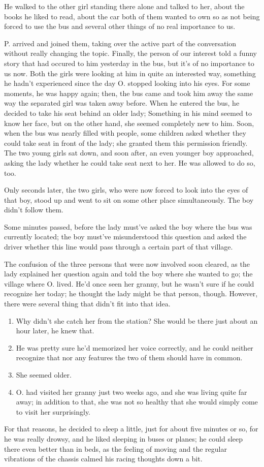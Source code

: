 He walked to the other girl standing there alone and talked to her, about the books he liked to read, about the car both of them wanted to own so as not being forced to use the bus and several other things of no real importance to us.

P. arrived and joined them, taking over the active part of the conversation without really changing the topic. 
Finally, the person of our interest told a funny story that had occured to him yesterday in the bus, but it's of no importance to us now. 
Both the girls were looking at him in quite an interested way, something he hadn't experienced since the day O. stopped looking into his eyes. 
For some moments, he was happy again; then, the bus came and took him away the same way the separated girl was taken away before. 
When he entered the bus, he decided to take his seat behind an older lady; Something in his mind seemed to know her face, but on the other hand, she seemed completely new to him. 
Soon, when the bus was nearly filled with people, some children asked whether they could take seat in front of the lady; she granted them this permission friendly. 
The two young girls sat down, and soon after, an even younger boy approached, asking the lady whether he could take seat next to her. 
He was allowed to do so, too.

Only seconds later, the two girls, who were now forced to look into the eyes of that boy, stood up and went to sit on some other place simultaneously. 
The boy didn't follow them.

Some minutes passed, before the lady must've asked the boy where the bus was currently located; the boy must've misunderstood this question and asked the driver whether this line would pass through a certain part of that village.

The confusion of the three persons that were now involved soon cleared, as the lady explained her question again and told the boy where she wanted to go; the village where O. lived. 
He'd once seen her granny, but he wasn't sure if he could recognize her today; he thought the lady might be that person, though. 
However, there were several thing that didn't fit into that idea. 
\begin{enumerate}
\item Why didn't she catch her from the station? She would be there just about an hour later, he knew that. 
\item He was pretty sure he'd memorized her voice correctly, and he could neither recognize that nor any features the two of them should have in common.
\item She seemed older. 
\item O. had visited her granny just two weeks ago, and she was living quite far away; in addition to that, she was not so healthy that she would simply come to visit her surprisingly. 
\end{enumerate}
For that reasons, he decided to sleep a little, just for about five minutes or so, for he was really drowsy, and he liked sleeping in buses or planes; he could sleep there even better than in beds, as the feeling of moving and the regular vibrations of the chassis calmed his racing thoughts down a bit.

